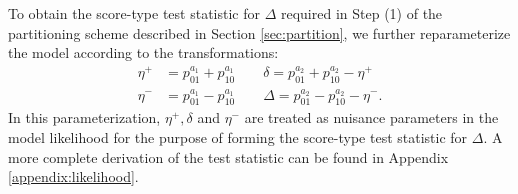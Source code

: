 \documentclass[11pt, sigconf, svgnames]{acmart}
\begin{document}
To obtain the score-type test statistic for $\Delta$ required in Step (1) of the partitioning scheme described in Section \ref{sec:partition}, we further reparameterize the model according to the transformations:
%
\newcommand{\basepw}{\eta^+}
\newcommand{\basemw}{\eta^-}
\newcommand{\diffpb}{\delta}
\newcommand{\diffmb}{\Delta}
\begin{align*}
  \basepw &= p_{01}^{a_1} + p_{10}^{a_1}\qquad  \diffpb = p_{01}^{a_2} + p_{10}^{a_2} - \basepw\\
  \basemw &= p_{01}^{a_1} - p_{10}^{a_1}\qquad  \Delta = p_{01}^{a_2} - p_{10}^{a_2} - \basemw .
\end{align*}
In this parameterization, $\basepw, \diffpb$ and $\basemw$ are treated as nuisance parameters in the model likelihood for the purpose of forming the score-type test statistic for $\Delta$.  A more complete derivation of the test statistic can be found in Appendix \ref{appendix:likelihood}.
\end{document}
